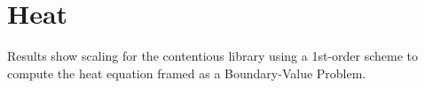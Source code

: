 \section{Heat}
Results show scaling for the contentious library using a 1st-order scheme to
compute the heat equation framed as a Boundary-Value Problem.

\begin{comment}
With optimization turned on vec behaves a lot like seq. Without
optimization, vec is a lot slower. All these benchmarks use optimization flags,
so the results are almost identical between seq and veche "async"
implementation uses C++ threads with the async
\end{comment}
